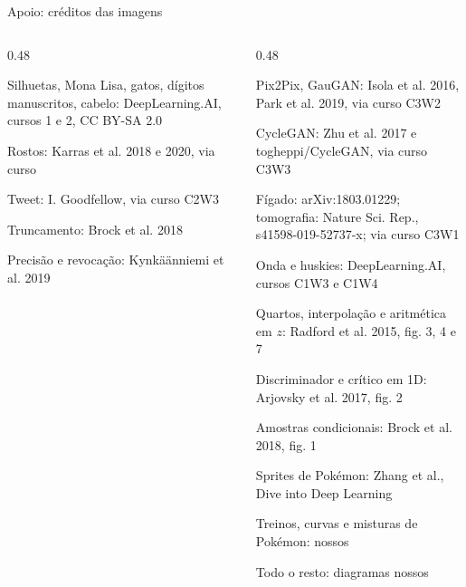 \documentclass[aspectratio=169,t]{beamer}
\begin{document}
\begin{frame}{Apoio: créditos das imagens}
  \begin{columns}[T,onlytextwidth]
    \begin{column}{0.48\textwidth}\raggedright\tiny
      Silhuetas, Mona Lisa, gatos, dígitos manuscritos, cabelo: DeepLearning.AI, cursos 1 e 2, CC BY-SA 2.0\par\smallskip
      Rostos: Karras et al. 2018 e 2020, via curso\par\smallskip
      Tweet: I. Goodfellow, via curso C2W3\par\smallskip
      Truncamento: Brock et al. 2018\par\smallskip
      Precisão e revocação: Kynkäänniemi et al. 2019\par\smallskip
    \end{column}
    \begin{column}{0.48\textwidth}\raggedright\tiny
      Pix2Pix, GauGAN: Isola et al. 2016, Park et al. 2019, via curso C3W2\par\smallskip
      CycleGAN: Zhu et al. 2017 e togheppi/CycleGAN, via curso C3W3\par\smallskip
      Fígado: arXiv:1803.01229; tomografia: Nature Sci. Rep., s41598-019-52737-x; via curso C3W1\par\smallskip
      Onda e huskies: DeepLearning.AI, cursos C1W3 e C1W4\par\smallskip
      Quartos, interpolação e aritmética em $z$: Radford et al. 2015, fig. 3, 4 e 7\par\smallskip
      Discriminador e crítico em 1D: Arjovsky et al. 2017, fig. 2\par\smallskip
      Amostras condicionais: Brock et al. 2018, fig. 1\par\smallskip
      Sprites de Pokémon: Zhang et al., Dive into Deep Learning\par\smallskip
      Treinos, curvas e misturas de Pokémon: nossos\par\smallskip
      Todo o resto: diagramas nossos\par\smallskip
    \end{column}
  \end{columns}
\end{frame}
\end{document}
